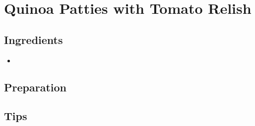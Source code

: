 \thispagestyle{fancy}
\section{Quinoa Patties with Tomato Relish}
\AddToShipoutPicture*{\QuinoaPatties}

\subsection*{Ingredients}
\begin{multicols}{3}
	\begin{itemize}
		\item 
	\end{itemize}
\end{multicols}


\subsection*{Preparation}

\subsection*{Tips}
